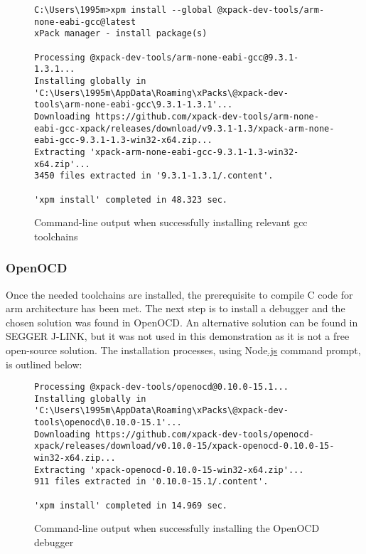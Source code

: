 \begin{figure}[H]
\begin{center}
\begin{lstlisting}[style=DOS]
C:\Users\1995m>xpm install --global @xpack-dev-tools/arm-none-eabi-gcc@latest
xPack manager - install package(s)

Processing @xpack-dev-tools/arm-none-eabi-gcc@9.3.1-1.3.1...
Installing globally in 'C:\Users\1995m\AppData\Roaming\xPacks\@xpack-dev-tools\arm-none-eabi-gcc\9.3.1-1.3.1'...
Downloading https://github.com/xpack-dev-tools/arm-none-eabi-gcc-xpack/releases/download/v9.3.1-1.3/xpack-arm-none-eabi-gcc-9.3.1-1.3-win32-x64.zip...
Extracting 'xpack-arm-none-eabi-gcc-9.3.1-1.3-win32-x64.zip'...
3450 files extracted in '9.3.1-1.3.1/.content'.

'xpm install' completed in 48.323 sec.
\end{lstlisting}
\caption{Command-line output when successfully installing relevant gcc toolchains}
\label{fig:cmd4}
\end{center}
\end{figure}

\subsubsection{OpenOCD}
\label{OpenOCD}
Once the needed toolchains are installed, the prerequisite to compile C code for arm architecture has been met. The next step is to install a debugger and the chosen solution was found in OpenOCD. An alternative solution can be found in SEGGER J-LINK, but it was not used in this demonstration as it is not a free open-source solution. The installation processes, using Node\hyperref[listExt]{.js} command prompt, is outlined below:
\begin{figure}[H]
\begin{center}
\begin{lstlisting}[style=DOS]
Processing @xpack-dev-tools/openocd@0.10.0-15.1...
Installing globally in 'C:\Users\1995m\AppData\Roaming\xPacks\@xpack-dev-tools\openocd\0.10.0-15.1'...
Downloading https://github.com/xpack-dev-tools/openocd-xpack/releases/download/v0.10.0-15/xpack-openocd-0.10.0-15-win32-x64.zip...
Extracting 'xpack-openocd-0.10.0-15-win32-x64.zip'...
911 files extracted in '0.10.0-15.1/.content'.

'xpm install' completed in 14.969 sec.
\end{lstlisting}
\caption{Command-line output when successfully installing the OpenOCD debugger}
\label{fig:cmd5}
\end{center}
\end{figure}

